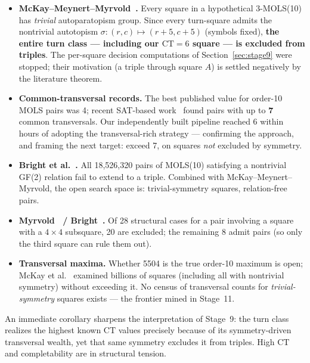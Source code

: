 \documentclass[11pt,a4paper]{article}
\theoremstyle{remark}
\newcommand{\CT}{\mathrm{CT}}
\begin{document}
\begin{itemize}[noitemsep]
  \item \textbf{McKay--Meynert--Myrvold~\cite{mmm2007}.} Every square in a
    hypothetical 3-MOLS(10) has \emph{trivial} autoparatopism group. Since
    every turn-square admits the nontrivial autotopism
    $\sigma : (r,c) \mapsto (r{+}5, c{+}5)$ (symbols fixed), \textbf{the
    entire turn class --- including our $\CT = 6$ square --- is excluded
    from triples}. The per-square decision computations of
    Section~\ref{sec:stage9} were stopped; their motivation (a triple
    through square $A$) is settled negatively by the literature theorem.
  \item \textbf{Common-transversal records.} The best published value for
    order-10 MOLS pairs was 4; recent SAT-based work~\cite{bright2022,bright2025} found
    pairs with up to \textbf{7} common transversals. Our independently built
    pipeline reached 6 within hours of adopting the transversal-rich
    strategy --- confirming the approach, and framing the next target:
    exceed 7, on squares \emph{not} excluded by symmetry.
  \item \textbf{Bright et al.~\cite{bright2022}.} All 18{,}526{,}320 pairs of MOLS(10)
    satisfying a nontrivial GF(2) relation fail to extend to a triple.
    Combined with McKay--Meynert--Myrvold, the open search space is:
    trivial-symmetry squares, relation-free pairs.
  \item \textbf{Myrvold~\cite{myrvold1999} / Bright~\cite{bright2025}.} Of 28 structural cases for
    a pair involving a square with a $4\times4$ subsquare, 20 are excluded;
    the remaining 8 admit pairs (so only the third square can rule them out).
  \item \textbf{Transversal maxima.} Whether 5504 is the true order-10
    maximum is open; McKay et al.~\cite{mmw2006} examined billions of squares (including
    all with nontrivial symmetry) without exceeding it. No census of
    transversal counts for \emph{trivial-symmetry} squares exists --- the
    frontier mined in Stage~11.
\end{itemize}

An immediate corollary sharpens the interpretation of Stage~9: the turn
class realizes the highest known $\CT$ values precisely because of its
symmetry-driven transversal wealth, yet that same symmetry excludes it from
triples. High $\CT$ and completability are in structural tension.

\end{document}
